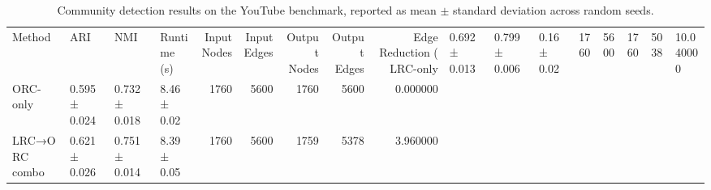 \begin{table}
\caption{Community detection results on the YouTube benchmark, reported as mean $\pm$ standard deviation across random seeds.}
\label{tab:youtube_results}
\begin{tabular}{llllrrrrr}
\toprule
Method & ARI & NMI & Runtime (s) & Input Nodes & Input Edges & Output Nodes & Output Edges & Edge Reduction (%
\midrule
LRC-only & 0.692 ± 0.013 & 0.799 ± 0.006 & 0.16 ± 0.02 & 1760 & 5600 & 1760 & 5038 & 10.040000 \\
ORC-only & 0.595 ± 0.024 & 0.732 ± 0.018 & 8.46 ± 0.02 & 1760 & 5600 & 1760 & 5600 & 0.000000 \\
LRC→ORC combo & 0.621 ± 0.026 & 0.751 ± 0.014 & 8.39 ± 0.05 & 1760 & 5600 & 1759 & 5378 & 3.960000 \\
\bottomrule
\end{tabular}
\end{table}
